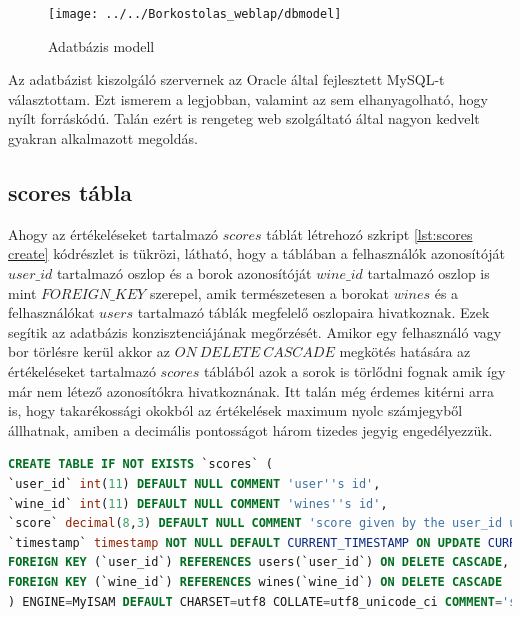 \documentclass[12pt]{report}
\theoremstyle{definition}
\begin{document}
	\begin{figure}[!ht]
		\centering
		\texttt{[image: ../../Borkostolas\_weblap/dbmodel]}
		\caption[Adatbázis modell]{Adatbázis modell \label{fig:dbmodel}}
	\end{figure}
	
	Az adatbázist kiszolgáló szervernek az Oracle által fejlesztett MySQL-t választottam. Ezt ismerem a legjobban, valamint az sem elhanyagolható, hogy nyílt forráskódú. Talán ezért is rengeteg web szolgáltató által nagyon kedvelt gyakran alkalmazott megoldás. 
	
	\subsection{scores tábla}
	
	Ahogy az értékeléseket tartalmazó $scores$ táblát létrehozó szkript  \ref{lst:scores create} kódrészlet is tükrözi, látható, hogy a táblában a felhasználók azonosítóját $user\_id$ tartalmazó oszlop és a borok azonosítóját $wine\_id$ tartalmazó oszlop is mint $FOREIGN\_KEY$ szerepel, amik természetesen a borokat $wines$ és a felhasználókat $users$ tartalmazó táblák megfelelő oszlopaira hivatkoznak. Ezek segítik az adatbázis konzisztenciájának megőrzését. Amikor egy felhasználó vagy bor törlésre kerül akkor az $ON\ DELETE\ CASCADE$ megkötés hatására az értékeléseket tartalmazó $scores$ táblából azok a sorok is törlődni fognak amik így már nem létező azonosítókra hivatkoznának. Itt talán még érdemes kitérni arra is, hogy takarékossági okokból az értékelések maximum nyolc számjegyből állhatnak, amiben a decimális pontosságot három tizedes jegyig engedélyezzük. 

 	
	\noindent\noindent\begin{minipage}{\linewidth}
		\begin{lstlisting}[language=sql,label={lst:scores create}, caption={Az értékeléseket tartalmazó ($scores$) táblát létrehozó parancs}]
CREATE TABLE IF NOT EXISTS `scores` (
`user_id` int(11) DEFAULT NULL COMMENT 'user''s id',
`wine_id` int(11) DEFAULT NULL COMMENT 'wines''s id',
`score` decimal(8,3) DEFAULT NULL COMMENT 'score given by the user_id user for the wine_id wine',
`timestamp` timestamp NOT NULL DEFAULT CURRENT_TIMESTAMP ON UPDATE CURRENT_TIMESTAMP,
FOREIGN KEY (`user_id`) REFERENCES users(`user_id`) ON DELETE CASCADE,
FOREIGN KEY (`wine_id`) REFERENCES wines(`wine_id`) ON DELETE CASCADE
) ENGINE=MyISAM DEFAULT CHARSET=utf8 COLLATE=utf8_unicode_ci COMMENT='score data';
		\end{lstlisting}
	\end{minipage}
		
\end{document}
